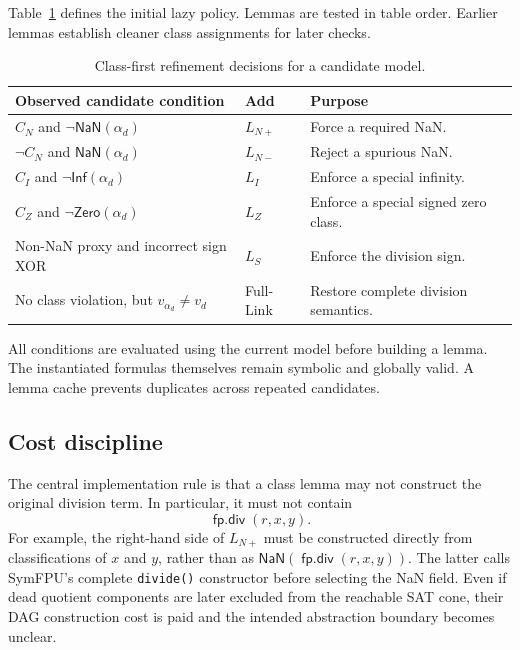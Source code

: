 \documentclass[runningheads]{llncs}
\newcommand{\fpdiv}{\mathop{\mathsf{fp.div}}}
\newcommand{\isnan}{\mathsf{NaN}}
\newcommand{\isinf}{\mathsf{Inf}}
\newcommand{\iszero}{\mathsf{Zero}}
\newcommand{\proxy}{\alpha_d}
\begin{document}
Table~\ref{tab:selection} defines the initial lazy policy.  Lemmas are tested
in table order.  Earlier lemmas establish cleaner class assignments for later
checks.

\begin{table}[t]
\centering
\caption{Class-first refinement decisions for a candidate model.}
\label{tab:selection}
\small
\begin{tabular}{p{}p{}p{}}
\toprule
Observed candidate condition & Add & Purpose \\
\midrule
\(C_N\) and \(\neg\isnan(\proxy)\)
  & \(L_{N+}\) & Force a required NaN. \\
\(\neg C_N\) and \(\isnan(\proxy)\)
  & \(L_{N-}\) & Reject a spurious NaN. \\
\(C_I\) and \(\neg\isinf(\proxy)\)
  & \(L_I\) & Enforce a special infinity. \\
\(C_Z\) and \(\neg\iszero(\proxy)\)
  & \(L_Z\) & Enforce a special signed zero class. \\
Non-NaN proxy and incorrect sign XOR
  & \(L_S\) & Enforce the division sign. \\
No class violation, but \(v_{\proxy}\ne v_d\)
  & Full-Link & Restore complete division semantics. \\
\bottomrule
\end{tabular}
\end{table}

All conditions are evaluated using the current model before building a lemma.
The instantiated formulas themselves remain symbolic and globally valid.  A
lemma cache prevents duplicates across repeated candidates.

\subsection{Cost discipline}

The central implementation rule is that a class lemma may not construct the
original division term.  In particular, it must not contain
\[
  \fpdiv(r,x,y).
\]
For example, the right-hand side of \(L_{N+}\) must be constructed directly
from classifications of \(x\) and \(y\), rather than as
\(\isnan(\fpdiv(r,x,y))\).  The latter calls SymFPU's complete
\texttt{divide()} constructor before selecting the NaN field.  Even if dead
quotient components are later excluded from the reachable SAT cone, their DAG
construction cost is paid and the intended abstraction boundary becomes
unclear.
\end{document}
